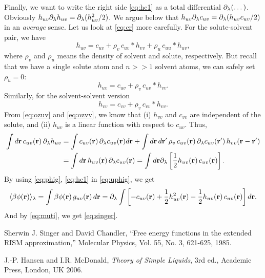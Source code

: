 \documentclass{article}
\begin{document}
Finally, we want to write the right side \eqref{eq:hc1} as
a total differential $\partial_\lambda(\dots)$.
%
Obviously $h_{uv} \partial_\lambda h_{uv} = \partial_\lambda ( h_{uv}^2/2 )$.
%
We argue below that $h_{uv} \partial_\lambda c_{uv} = \partial_\lambda ( h_{uv} c_{uv} /2) $
in an \emph{average} sense.
Let us look at \eqref{eq:cr} more carefully.
%
For the solute-solvent pair, we have
\[
  h_{uv} = c_{uv} + \rho_v \, c_{uv}*h_{vv}
  + \rho_u \, c_{uu}*h_{uv},
\]
where $\rho_v$ and $\rho_u$ means the density of
solvent and solute, respectively.
%
But recall that we have a single solute atom and $n >> 1$ solvent atoms,
we can safely set $\rho_u = 0$:
\begin{equation}
  h_{uv} = c_{uv} + \rho_v \, c_{uv}*h_{vv}.
  \label{eq:ozuv}
\end{equation}
Similarly, for the solvent-solvent version
\begin{equation}
  h_{vv} = c_{vv} + \rho_v \, c_{vv}*h_{vv}.
  \label{eq:ozvv}
\end{equation}
From \eqref{eq:ozuv} and \eqref{eq:ozvv}, we know that
  (i) $h_{vv}$ and $c_{vv}$ are independent of the solute,
  and
  (ii) $h_{uv}$ is a linear function with respect to $c_{uv}$.
%
Thus,
\begin{align}
  \int d\mathbf{r} \, c_{uv}(\mathbf{r}) \, \partial_\lambda h_{uv}
  &=
  \int c_{uv}(\mathbf{r}) \, \partial_\lambda c_{uv}(\mathbf{r}) d\mathbf{r}
    +
    \int d\mathbf{r} \, d\mathbf{r}'
    \, \rho_v
    \, c_{uv}(\mathbf{r})
    \, \partial_\lambda c_{uv}(\mathbf{r}') \, h_{vv}(\mathbf{r} - \mathbf{r}') \notag \\
  &= \int d\mathbf{r} \, h_{uv}(\mathbf{r}) \, \partial_\lambda c_{uv}(\mathbf{r})
   = \int d\mathbf{r} \partial_\lambda
    \left[
      \frac{1}{2} h_{uv}(\mathbf{r}) \,  c_{uv}(\mathbf{r})
    \right].
  \label{eq:phig}
\end{align}
%
By using \eqref{eq:phig}, \eqref{eq:hc1} in \eqref{eq:uphig}, we get
%
\[
  \langle
  \beta \phi(\mathbf{r})
  \rangle_\lambda
  =
  \int \beta \phi(\mathbf{r}) \, g_{uv}(\mathbf{r}) \, d \mathbf{r}
  =
   \partial_\lambda \int \left[
    - c_{uv}(\mathbf{r})
    + \frac{1}{2} h_{uv}^2(\mathbf{r})
    - \frac{1}{2} h_{uv}(\mathbf{r}) \, c_{uv}(\mathbf{r})
    \right] d \mathbf{r}.
\]
And by \eqref{eq:muti}, we get \eqref{eq:singer}.



\begin{thebibliography}{100}

  Sherwin J. Singer and David Chandler,
  ``Free energy functions in the extended RISM approximation,''
  Molecular Physics, Vol. 55, No. 3, 621-625,
  1985.

  J.-P. Hansen and I.R. McDonald,
  {\it Theory of Simple Liquids}, 3rd ed.,
  Academic Press, London, UK 2006.

\end{thebibliography}
\end{document}
